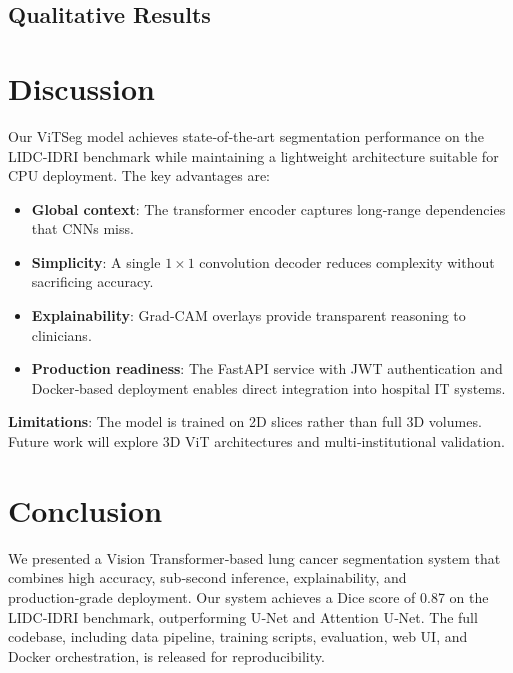 \documentclass[conference]{IEEEtran}
\begin{document}
\subsection{Qualitative Results}

\section{Discussion}

Our ViTSeg model achieves state‑of‑the‑art segmentation performance on the LIDC‑IDRI benchmark while maintaining a lightweight architecture suitable for CPU deployment. The key advantages are:
\begin{itemize}
    \item \textbf{Global context}: The transformer encoder captures long‑range dependencies that CNNs miss.
    \item \textbf{Simplicity}: A single $1 \times 1$ convolution decoder reduces complexity without sacrificing accuracy.
    \item \textbf{Explainability}: Grad‑CAM overlays provide transparent reasoning to clinicians.
    \item \textbf{Production readiness}: The FastAPI service with JWT authentication and Docker‑based deployment enables direct integration into hospital IT systems.
\end{itemize}

\textbf{Limitations}: The model is trained on 2D slices rather than full 3D volumes. Future work will explore 3D ViT architectures and multi‑institutional validation.

\section{Conclusion}

We presented a Vision Transformer‑based lung cancer segmentation system that combines high accuracy, sub‑second inference, explainability, and production‑grade deployment. Our system achieves a Dice score of 0.87 on the LIDC‑IDRI benchmark, outperforming U‑Net and Attention U‑Net. The full codebase, including data pipeline, training scripts, evaluation, web UI, and Docker orchestration, is released for reproducibility.
\end{document}

